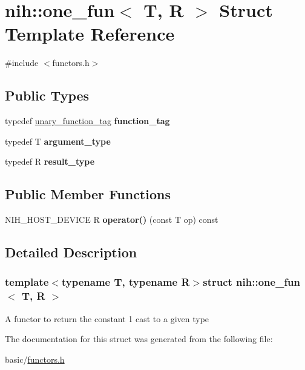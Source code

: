 \hypertarget{structnih_1_1one__fun}{
\section{nih\-:\-:one\-\_\-fun$<$ \-T, \-R $>$ \-Struct \-Template \-Reference}
\label{structnih_1_1one__fun}
}


{\ttfamily \#include $<$functors.\-h$>$}

\subsection*{\-Public \-Types}
\begin{DoxyCompactItemize}
\item 
\hypertarget{structnih_1_1one__fun_ad389b85134617af5bde779da643303a2}{
typedef \hyperlink{structnih_1_1unary__function__tag}{unary\-\_\-function\-\_\-tag} {\bfseries function\-\_\-tag}}
\label{structnih_1_1one__fun_ad389b85134617af5bde779da643303a2}

\item 
\hypertarget{structnih_1_1one__fun_a15ca2d4b6e51c53917277871144b8355}{
typedef \-T {\bfseries argument\-\_\-type}}
\label{structnih_1_1one__fun_a15ca2d4b6e51c53917277871144b8355}

\item 
\hypertarget{structnih_1_1one__fun_abf9b769d82d7a710c458fd5a6358b1f0}{
typedef \-R {\bfseries result\-\_\-type}}
\label{structnih_1_1one__fun_abf9b769d82d7a710c458fd5a6358b1f0}

\end{DoxyCompactItemize}
\subsection*{\-Public \-Member \-Functions}
\begin{DoxyCompactItemize}
\item 
\hypertarget{structnih_1_1one__fun_a51e01d64b94f7fe96c2e5dbb27a1c499}{
\-N\-I\-H\-\_\-\-H\-O\-S\-T\-\_\-\-D\-E\-V\-I\-C\-E \-R {\bfseries operator()} (const \-T op) const }
\label{structnih_1_1one__fun_a51e01d64b94f7fe96c2e5dbb27a1c499}

\end{DoxyCompactItemize}


\subsection{\-Detailed \-Description}
\subsubsection*{template$<$typename T, typename R$>$struct nih\-::one\-\_\-fun$<$ T, R $>$}

\-A functor to return the constant 1 cast to a given type 

\-The documentation for this struct was generated from the following file\-:\begin{DoxyCompactItemize}
\item 
basic/\hyperlink{functors_8h}{functors.\-h}\end{DoxyCompactItemize}
